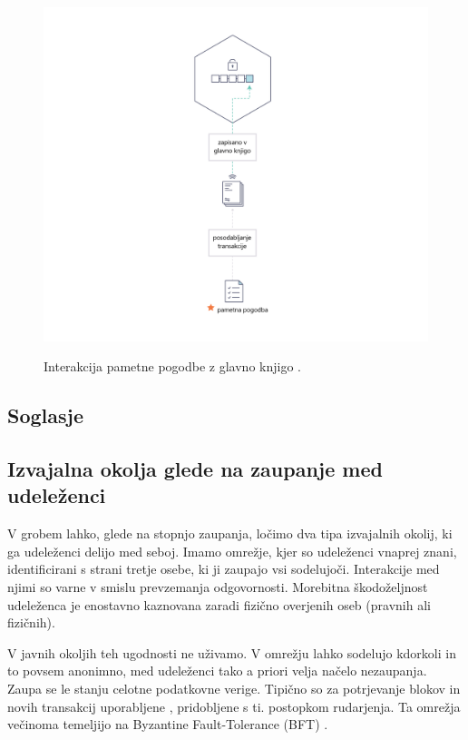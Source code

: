 \documentclass[a4paper, 12pt]{book}
\begin{document}
\begin{figure}[h]
	\includegraphics[width=1.0\textwidth]{slike/Smart_Contract_sl.png}
	\label{smart_contract}
	\caption{Interakcija pametne pogodbe z glavno knjigo \cite{hyperledgerDocs}.}
\end{figure}


\subsection{Soglasje}



\subsection{Izvajalna okolja glede na zaupanje med udeleženci}
V grobem lahko, glede na stopnjo zaupanja, ločimo dva tipa izvajalnih okolij, ki ga udeleženci delijo med seboj.
Imamo omrežje, kjer so udeleženci vnaprej znani, identificirani s strani tretje osebe, ki ji zaupajo vsi sodelujoči.
Interakcije med njimi so varne v smislu prevzemanja odgovornosti.
Morebitna škodoželjnost udeleženca je enostavno kaznovana zaradi fizično overjenih oseb (pravnih ali fizičnih).

V javnih okoljih teh ugodnosti ne uživamo.
V omrežju lahko sodelujo kdorkoli in to povsem anonimno,
med udeleženci tako a priori velja načelo nezaupanja.
Zaupa se le stanju celotne podatkovne verige.
Tipično so za potrjevanje blokov in novih transakcij uporabljene , pridobljene s ti. postopkom rudarjenja.
Ta omrežja večinoma temeljijo na Byzantine Fault-Tolerance (BFT) \cite{hyperledgerDocs, castro1999practical}.
\end{document}
